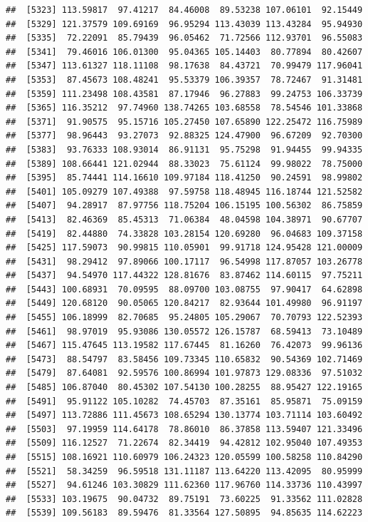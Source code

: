 \documentclass[
]{article}
\begin{document}
\begin{verbatim}
##  [5323] 113.59817  97.41217  84.46008  89.53238 107.06101  92.15449
##  [5329] 121.37579 109.69169  96.95294 113.43039 113.43284  95.94930
##  [5335]  72.22091  85.79439  96.05462  71.72566 112.93701  96.55083
##  [5341]  79.46016 106.01300  95.04365 105.14403  80.77894  80.42607
##  [5347] 113.61327 118.11108  98.17638  84.43721  70.99479 117.96041
##  [5353]  87.45673 108.48241  95.53379 106.39357  78.72467  91.31481
##  [5359] 111.23498 108.43581  87.17946  96.27883  99.24753 106.33739
##  [5365] 116.35212  97.74960 138.74265 103.68558  78.54546 101.33868
##  [5371]  91.90575  95.15716 105.27450 107.65890 122.25472 116.75989
##  [5377]  98.96443  93.27073  92.88325 124.47900  96.67209  92.70300
##  [5383]  93.76333 108.93014  86.91131  95.75298  91.94455  99.94335
##  [5389] 108.66441 121.02944  88.33023  75.61124  99.98022  78.75000
##  [5395]  85.74441 114.16610 109.97184 118.41250  90.24591  98.99802
##  [5401] 105.09279 107.49388  97.59758 118.48945 116.18744 121.52582
##  [5407]  94.28917  87.97756 118.75204 106.15195 100.56302  86.75859
##  [5413]  82.46369  85.45313  71.06384  48.04598 104.38971  90.67707
##  [5419]  82.44880  74.33828 103.28154 120.69280  96.04683 109.37158
##  [5425] 117.59073  90.99815 110.05901  99.91718 124.95428 121.00009
##  [5431]  98.29412  97.89066 100.17117  96.54998 117.87057 103.26778
##  [5437]  94.54970 117.44322 128.81676  83.87462 114.60115  97.75211
##  [5443] 100.68931  70.09595  88.09700 103.08755  97.90417  64.62898
##  [5449] 120.68120  90.05065 120.84217  82.93644 101.49980  96.91197
##  [5455] 106.18999  82.70685  95.24805 105.29067  70.70793 122.52393
##  [5461]  98.97019  95.93086 130.05572 126.15787  68.59413  73.10489
##  [5467] 115.47645 113.19582 117.67445  81.16260  76.42073  99.96136
##  [5473]  88.54797  83.58456 109.73345 110.65832  90.54369 102.71469
##  [5479]  87.64081  92.59576 100.86994 101.97873 129.08336  97.51032
##  [5485] 106.87040  80.45302 107.54130 100.28255  88.95427 122.19165
##  [5491]  95.91122 105.10282  74.45703  87.35161  85.95871  75.09159
##  [5497] 113.72886 111.45673 108.65294 130.13774 103.71114 103.60492
##  [5503]  97.19959 114.64178  78.86010  86.37858 113.59407 121.33496
##  [5509] 116.12527  71.22674  82.34419  94.42812 102.95040 107.49353
##  [5515] 108.16921 110.60979 106.24323 120.05599 100.58258 110.84290
##  [5521]  58.34259  96.59518 131.11187 113.64220 113.42095  80.95999
##  [5527]  94.61246 103.30829 111.62360 117.96760 114.33736 110.43997
##  [5533] 103.19675  90.04732  89.75191  73.60225  91.33562 111.02828
##  [5539] 109.56183  89.59476  81.33564 127.50895  94.85635 114.62223

\end{verbatim}
\end{document}
